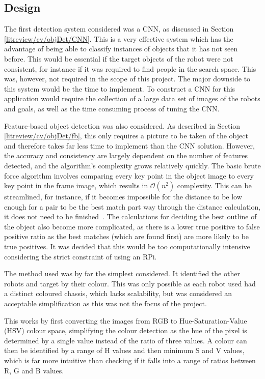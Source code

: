 \subsection{Design}\label{soft/cv/design}
The first detection system considered was a CNN, as discussed in Section
\ref{litreview/cv/objDet/CNN}. This is a very effective system which has
the advantage of
being able to classify instances of objects that it has not
seen before. This would be essential if the target objects of
the robot were not consistent, for instance if it was required to find
people in the search space. This was, however, not required
in the scope of this project. The major downside to this
system would be the time to implement. To construct a CNN for
this application would require the collection of a large data
set of images of the robots and goals, as well as the time
consuming process of tuning the CNN.

Feature-based object detection was also considered. As described in
Section \ref{litreview/cv/objDet/fb}, this only requires a picture to be
taken of the object and therefore takes far less time to
implement than the CNN solution. However, the accuracy and
consistency are largely dependent on the number of features
detected, and the algorithm's complexity grows relatively
quickly. The basic brute force algorithm involves comparing
every key point in the object image to every key point in the
frame image, which results in $\mathcal{O}(n^2)$ complexity. This can be streamlined, for instance, if it becomes impossible
for the distance to be low enough for a pair to be the best
match part way through the distance calculation, it does not
need to be finished~\cite{opencv_library}. The calculations for deciding the best
outline of the object also become more complicated, as there
is a lower true positive to false positive ratio as the
best matches (which are found first) are more likely to be
true positives. It was decided that this would be too
computationally intensive considering the strict constraint of
using an RPi.

The method used was by far the simplest considered. It identified the other robots and target
by their colour. This was only possible as each robot used had a distinct coloured chassis,
which lacks scalability, but was considered an acceptable simplification as this was not the
focus of the project.

This works by first converting the images from RGB to Hue-Saturation-Value (HSV) colour space,
simplifying the colour detection as the hue of the pixel is determined by a single value
instead of the ratio of three values. A colour can then be identified by a range of H values
and then minimum S and V values, which is far more intuitive than checking if it falls into a
range of ratios between R, G and B values.

